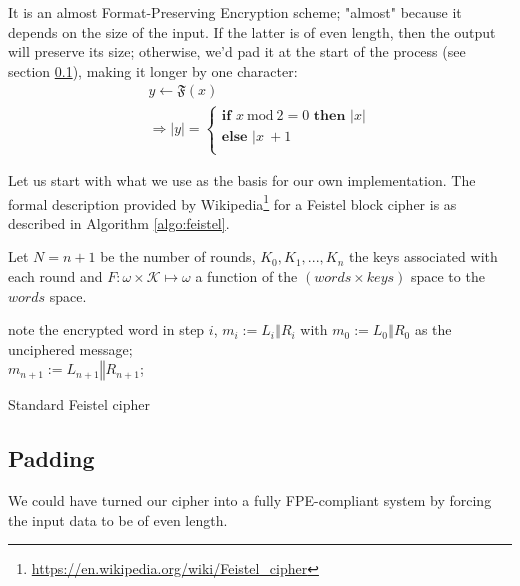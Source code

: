 \documentclass[twoside,twocolumn]{article}
\newcommand{\mod}[1]{\ \mathrm{mod}\ #1}
\theoremstyle{definition}
\theoremstyle{remark}
\begin{document}
It is an almost Format-Preserving Encryption scheme; "almost" because it depends on the size of the input. If the latter is of even length, then the 
output will preserve its size; otherwise, we'd pad it at the start of the process (see section \ref{padding}), making it longer by one character:
\begin{equation}
    \label{fpe}
    \begin{array}{l}
        y \gets \mathfrak{F}(x) \\
        \Rightarrow |y| = \left\{
            \begin{array}{l}
                \textbf{if } x \mod 2 = 0 \textbf{ then } |x| \\
                \textbf{else } |x\ + 1 \\
            \end{array}
            \right.
    \end{array}
\end{equation}

Let us start with what we use as the basis for our own implementation.
The formal description provided by Wikipedia\footnote{\url{https://en.wikipedia.org/wiki/Feistel_cipher}} for a Feistel block cipher is as described in 
Algorithm \ref{algo:feistel}.

Let $N = n+1$ be the number of rounds, $K_{0},K_{1},...,K_{n}$ the keys associated with each round and $F: \omega \times \mathcal{K} \mapsto \omega$ a 
function of the $(words \times keys)$ space to the $words$ space.
\begin{algorithm}
    note the encrypted word in step $i$, $m_i := L_i \mathbin\Vert R_i$ with $m_0 := L_0 \mathbin\Vert R_0$ as the unciphered message; \\
    $m_{n+1} := L_{n+1} \mathbin\Vert R_{n+1}$; \\
    \caption{Standard Feistel cipher}
    \label{algo:feistel}
\end{algorithm}

\subsection{Padding}
\label{padding}

We could have turned our cipher into a fully FPE-compliant system by forcing the input data to be of even length.
\end{document}
